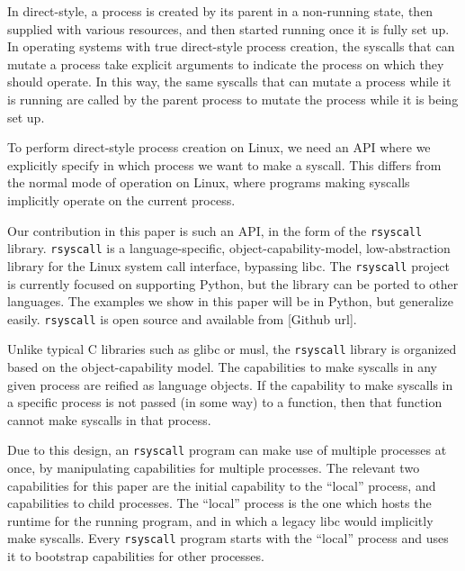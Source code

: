 \documentclass[letterpaper,twocolumn,10pt]{article}
\begin{document}
In direct-style, a process is created by its parent in a non-running state,
then supplied with various resources,
and then started running once it is fully set up.
In operating systems with true direct-style process creation,
the syscalls that can mutate a process
take explicit arguments to indicate the process on which they should operate.\cite{keykos}\cite{sel4}
In this way, the same syscalls that can mutate a process while it is running
are called by the parent process to mutate the process while it is being set up.

To perform direct-style process creation on Linux,
we need an API where we explicitly specify in which process we want to make a syscall.
This differs from the normal mode of operation on Linux,
where programs making syscalls implicitly operate on the current process.

Our contribution in this paper is such an API, in the form of the \texttt{rsyscall} library.
\texttt{rsyscall} is a
language-specific, object-capability-model, low-abstraction library for the Linux system call interface,
bypassing libc.\cite{capmyths}
The \texttt{rsyscall} project is currently focused on supporting Python,
but the library can be ported to other languages.
The examples we show in this paper will be in Python,
but generalize easily.
\texttt{rsyscall} is open source and available from
[Github url].

Unlike typical C libraries such as glibc or musl,
the \texttt{rsyscall} library is organized based on the object-capability model.\cite{capmyths}
The capabilities to make syscalls in any given process are reified as language objects.
If the capability to make syscalls in a specific process is not passed (in some way) to a function,
then that function cannot make syscalls in that process.

Due to this design, an \texttt{rsyscall} program can make use of multiple processes at once,
by manipulating capabilities for multiple processes.
The relevant two capabilities for this paper are the initial capability to the ``local'' process,
and capabilities to child processes.
The ``local'' process is the one which hosts the runtime for the running program,
and in which a legacy libc would implicitly make syscalls.
Every \texttt{rsyscall} program starts with the ``local'' process
and uses it to bootstrap capabilities for other processes.
\end{document}
